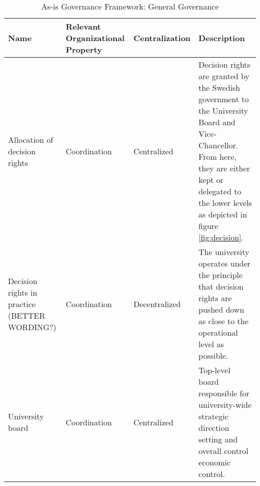 \begin{table}[H]
\caption{As-is Governance Framework: General Governance}
\label{table:as-isGeneralGovernance}
\begin{tabular}{ | p{} | p{}| p{} | p{}|}
%
\hline
%
\textbf{Name} & 
\textbf{Relevant Organizational Property} &
\textbf{Centralization} &  
\textbf{Description} \\
%
\hline
%
 Allocation of decision rights & 
 Coordination &
 Centralized & 
 Decision rights are granted by the Swedish government to the University Board and Vice-Chancellor. From here, they are either kept or delegated to the lower levels as depicted in figure \ref{fig:decision}. \\
%
\hline
%
 Decision rights in practice (BETTER WORDING?) & 
 Coordination &
 Decentralized & 
 The university operates under the principle that decision rights are pushed down as close to the operational level as possible. \\
%
\hline
%
%
%
 University board &
 Coordination &
 Centralized &
 Top-level board responsible for university-wide strategic direction setting and overall control economic control. \\
%
\hline
%
 

\end{tabular}
\end{table}
